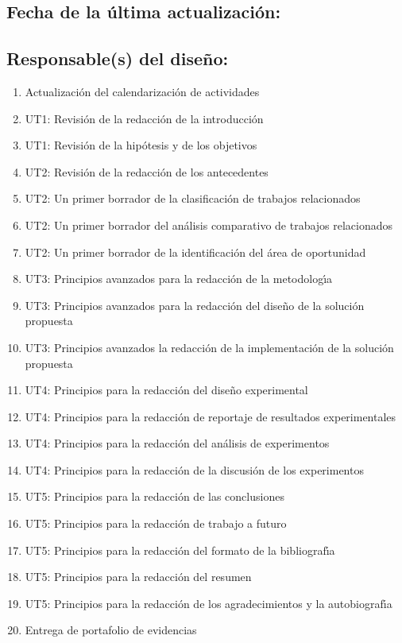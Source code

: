\documentclass[10 pt]{article}
\begin{document}
\subsection{Fecha de la \'{u}ltima actualizaci\'{o}n:} 
\subsection{Responsable(s) del dise\~{n}o:}
\fbox{\parbox{9cm}{\begin{itemize}[label={}]
\item {\nroger~\roger}
\item {\nelisa~\elisa}
\end{itemize}}}
\newpage



\begin{enumerate}[itemsep=-2pt]
\item Actualizaci\'{o}n del calendarizaci\'{o}n de actividades
\item UT1: Revisi\'{o}n de la redacci\'{o}n de la introducci\'{o}n
\item UT1: Revisi\'{o}n de la hip\'{o}tesis y de los objetivos
\item UT2: Revisi\'{o}n de la redacci\'{o}n de los antecedentes
\item UT2: Un primer borrador de la clasificaci\'{o}n de trabajos relacionados
\item UT2: Un primer borrador del an\'{a}lisis comparativo de trabajos relacionados
\item UT2: Un primer borrador de la identificaci\'{o}n del \'{a}rea de oportunidad
\item UT3: Principios avanzados para la redacci\'{o}n de la metodolog\'{\i}a
\item UT3: Principios avanzados para la redacci\'{o}n del dise\~{n}o de la soluci\'{o}n propuesta
\item UT3: Principios avanzados la redacci\'{o}n de la implementaci\'{o}n de la soluci\'{o}n propuesta
\item UT4: Principios para la redacci\'{o}n del dise\~{n}o experimental
\item UT4: Principios para la redacci\'{o}n de reportaje de resultados experimentales
\item UT4: Principios para la redacci\'{o}n del an\'{a}lisis de experimentos
\item UT4: Principios para la redacci\'{o}n de la discusi\'{o}n de los experimentos
\item UT5: Principios para la redacci\'{o}n de las conclusiones
\item UT5: Principios para la redacci\'{o}n de trabajo a futuro
\item UT5: Principios para la redacci\'{o}n del formato de la bibliograf\'{\i}a
\item UT5: Principios para la redacci\'{o}n del resumen
\item UT5: Principios para la redacci\'{o}n de los agradecimientos y la autobiograf\'{\i}a
\item Entrega de portafolio de evidencias
\end{enumerate}
\end{document}
